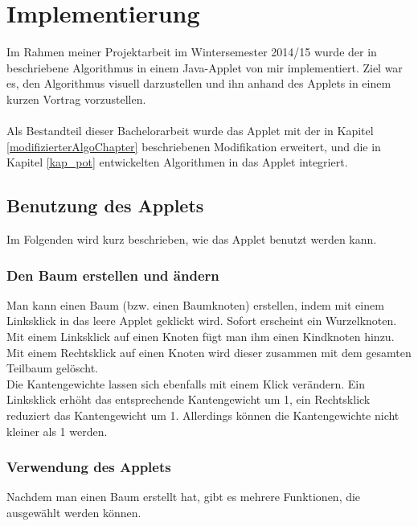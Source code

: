 \section{Implementierung}\label{kap_implementierung}

Im Rahmen meiner Projektarbeit im Wintersemester 2014/15 wurde der in \cite{cima_paper} beschriebene Algorithmus in einem Java-Applet von mir implementiert. Ziel war es, den Algorithmus visuell darzustellen und ihn anhand des Applets in einem kurzen Vortrag vorzustellen.
\\
\\
Als Bestandteil dieser Bachelorarbeit wurde das Applet mit der in Kapitel \ref{modifizierterAlgoChapter} beschriebenen Modifikation erweitert, und die in Kapitel \ref{kap_pot} entwickelten Algorithmen in das Applet integriert.


\subsection*{Benutzung des Applets}

Im Folgenden wird kurz beschrieben, wie das Applet benutzt werden kann.

\subsubsection*{Den Baum erstellen und ändern}

Man kann einen Baum (bzw. einen Baumknoten) erstellen, indem mit einem Linksklick in das leere Applet geklickt wird. Sofort erscheint ein Wurzelknoten.\\
Mit einem Linksklick auf einen Knoten fügt man ihm einen Kindknoten hinzu. Mit einem Rechtsklick auf einen Knoten wird dieser zusammen mit dem gesamten Teilbaum gelöscht.\\
Die Kantengewichte lassen sich ebenfalls mit einem Klick verändern. Ein Linksklick erhöht das entsprechende Kantengewicht um 1, ein Rechtsklick reduziert das Kantengewicht um 1. Allerdings können die Kantengewichte nicht kleiner als 1 werden.


\subsubsection*{Verwendung des Applets}

Nachdem man einen Baum erstellt hat, gibt es mehrere Funktionen, die ausgewählt werden können.\\

